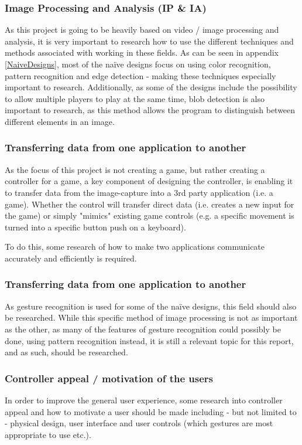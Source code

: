 \subsubsection{Image Processing and Analysis (IP \& IA)}
As this project is going to be heavily based on video / image processing and analysis, it is very important to research how to use the different techniques and methods associated with working in these fields. As can be seen in appendix \ref{NaiveDesigns}, most of the naïve designs focus on using color recognition, pattern recognition and edge detection - making these techniques especially important to research. Additionally, as some of the designs include the possibility to allow multiple players to play at the same time, blob detection is also important to research, as this method allows the program to distinguish between different elements in an image.

\subsubsection{Transferring data from one application to another}
As the focus of this project is not creating a game, but rather creating a controller for a game, a key component of designing the controller, is enabling it to transfer data from the image-capture into a 3rd party application (i.e. a game). Whether the control will transfer direct data (i.e. creates a new input for the game) or simply "mimics" existing game controls (e.g. a specific movement is turned into a specific button push on a keyboard).

To do this, some research of how to make two applications communicate accurately and efficiently is required.

\subsubsection{Transferring data from one application to another}
As gesture recognition is used for some of the naïve designs, this field should also be researched. While this specific method of image processing is not as important as the other, as many of the features of gesture recognition could possibly be done, using pattern recognition instead, it is still a relevant topic for this report, and as such, should be researched.

\subsubsection{Controller appeal / motivation of the users}
In order to improve the general user experience, some research into controller appeal and how to motivate a user should be made including - but not limited to - physical design, user interface and user controls (which gestures are most appropriate to use etc.).

